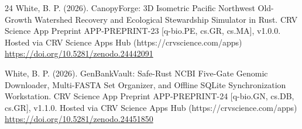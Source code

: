 \documentclass[10pt,letterpaper]{article}
\begin{document}
\begin{thebibliography}{24}
 White, B. P. (2026). CanopyForge: 3D Isometric Pacific Northwest Old-Growth Watershed Recovery and Ecological Stewardship Simulator in Rust. CRV Science App Preprint APP-PREPRINT-23 [q-bio.PE, cs.GR, cs.MA], v1.0.0. Hosted via CRV Science Apps Hub (https://crvscience.com/apps) \url{https://doi.org/10.5281/zenodo.24442091}

 White, B. P. (2026). GenBankVault: Safe-Rust NCBI Five-Gate Genomic Downloader, Multi-FASTA Set Organizer, and Offline SQLite Synchronization Workstation. CRV Science App Preprint APP-PREPRINT-24 [q-bio.GN, cs.DB, cs.GR], v1.1.0. Hosted via CRV Science Apps Hub (https://crvscience.com/apps) \url{https://doi.org/10.5281/zenodo.24451850}
\end{thebibliography}
\end{document}
